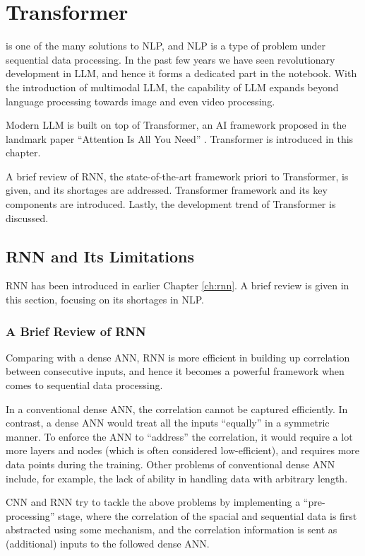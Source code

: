 \chapter{Transformer} \label{ch:transformer}

 is one of the many solutions to NLP, and NLP is a type of problem under sequential data processing. In the past few years we have seen revolutionary development in LLM, and hence it forms a dedicated part in the notebook. With the introduction of multimodal LLM, the capability of LLM expands beyond language processing towards image and even video processing. 

Modern LLM is built on top of Transformer, an AI framework proposed in the landmark paper ``Attention Is All You Need'' \cite{vaswani2017attention}. Transformer is introduced in this chapter. 

A brief review of RNN, the state-of-the-art framework priori to Transformer, is given, and its shortages are addressed. Transformer framework and its key components are introduced. Lastly, the development trend of Transformer is discussed.

\section{RNN and Its Limitations}

RNN has been introduced in earlier Chapter \ref{ch:rnn}. A brief review is given in this section, focusing on its shortages in NLP.

\subsection{A Brief Review of RNN}

Comparing with a dense ANN, RNN is more efficient in building up correlation between consecutive inputs, and hence it becomes a powerful framework when comes to sequential data processing. 


In a conventional dense ANN, the correlation cannot be captured efficiently. In contrast, a dense ANN would treat all the inputs ``equally'' in a symmetric manner. To enforce the ANN to ``address'' the correlation, it would require a lot more layers and nodes (which is often considered low-efficient), and requires more data points during the training. Other problems of conventional dense ANN include, for example, the lack of ability in handling data with arbitrary length.

CNN and RNN try to tackle the above problems by implementing a ``pre-processing'' stage, where the correlation of the spacial and sequential data is first abstracted using some mechanism, and the correlation information is sent as (additional) inputs to the followed dense ANN.

